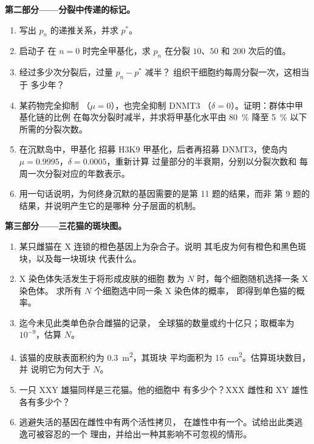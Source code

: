 \begin{problem}
\medskip
\noindent\textbf{第二部分——分裂中传递的标记。}
\begin{enumerate}[resume]
  \item 写出 $p_{n}$ 的递推关系，并求 $p^{*}$。
  \item 启动子  在 $n = 0$ 时完全甲基化，求 $p_{n}$
        在分裂 $10$、$50$ 和 $200$ 次后的值。
  \item 经过多少次分裂后，过量 $p_{n} - p^{*}$ 减半？
        组织干细胞约每周分裂一次，这相当于
        多少年？
  \item 某药物完全抑制 （$\mu = 0$），也完全抑制 DNMT3
        （$\delta = 0$）。证明：群体中甲基化链的比例
        在每次分裂时减半，并求将甲基化水平由 \qty{80}{\%}
        降至 \qty{5}{\%} 以下所需的分裂次数。
  \item 在沉默岛中，甲基化  招募 H3K9
        甲基化，后者再招募 DNMT3，使岛内
        $\mu = 0.9995$，$\delta = 0.0005$，重新计算
        过量部分的半衰期，分别以分裂次数和
        每周一次分裂对应的年数表示。
  \item 用一句话说明，为何终身沉默的基因需要的是第 11 题的结果，而非
        第 9 题的结果，并说明产生它的是哪种
        分子层面的机制。
\end{enumerate}

\medskip
\noindent\textbf{第三部分——三花猫的斑块图。}
\begin{enumerate}[resume]
  \item 某只雌猫在 X 连锁的橙色基因上为杂合子。说明
        其毛皮为何有橙色和黑色斑块，以及每一块斑块
        代表什么。
  \item X 染色体失活发生于将形成皮肤的细胞
        数为 $N$ 时，每个细胞随机选择一条 X 染色体。
        求所有 $N$ 个细胞选中同一条 X 染色体的概率，
        即得到单色猫的概率。
  \item 迄今未见此类单色杂合雌猫的记录，
        全球猫的数量或约十亿只；取概率为
        $10^{-9}$，估算 $N$。
  \item 该猫的皮肤表面积约为 \qty{0.3}{m^2}，其斑块
        平均面积为 \qty{15}{cm^2}。估算斑块数目，并
        说明它为何大于 $N$。
  \item 一只 XXY 雄猫同样是三花猫。他的细胞中
        有多少个？XXX 雌性和 XY 雄性各有多少个？
  \item 逃避失活的基因在雌性中有两个活性拷贝，
        在雄性中有一个。试给出此类逃逸可被容忍的一个
        理由，并给出一种其影响不可忽视的情形。
\end{enumerate}


\end{problem}
